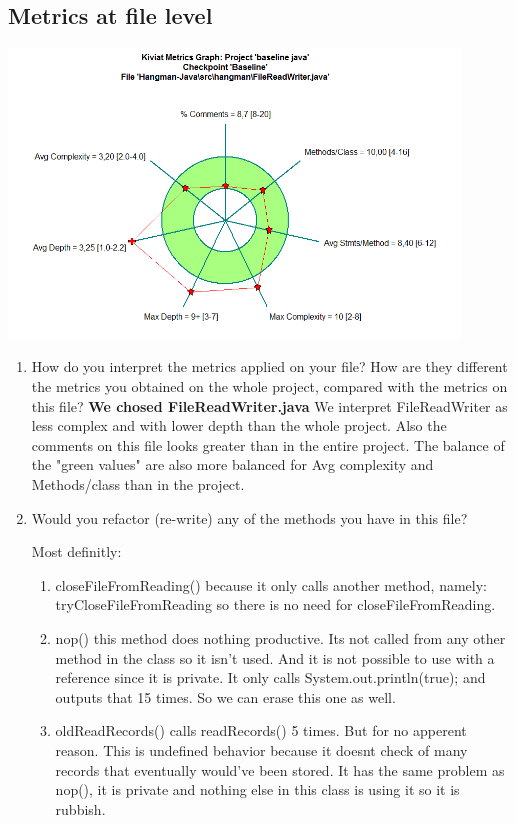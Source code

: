 \documentclass{article}
\begin{document}
\subsection{Metrics at file level}
\vspace {0.10 cm}
\begin{center}
\includegraphics[width=0.9\textwidth]{FileReadWriter-kiviat-before.png}
\end{center}
\begin{enumerate}
\item
How	do	you	interpret	 the	metrics	applied	on	your	file? How	are	 they	different	 the	metrics	you	
obtained	on	the	whole	project,	compared	with	the	metrics	on	this	file?\newline
\textbf{We chosed FileReadWriter.java}
We interpret FileReadWriter as less complex and with lower depth than
the whole project. Also the comments on this file looks greater than in
the entire project. The balance of the "green values" are also more balanced for Avg complexity
and Methods/class than in the project. 


\item
Would	you	refactor	(re-write)	any	of	the	methods you	have	in	this	file?	

Most definitly:
\begin{enumerate}
\item
closeFileFromReading() because it only calls another method, namely: tryCloseFileFromReading so there is no need for closeFileFromReading.

\item
nop() this method does nothing productive. Its not called from any other method in the class so it isn't used. And it is not possible to use with a reference since it is private.  It only calls System.out.println(true);
and outputs that 15 times. So we can erase this one as well. 

\item
oldReadRecords() calls readRecords() 5 times. But for no apperent reason.
This is undefined behavior because it doesnt check of many records that eventually
would've been stored. It has the same problem as nop(), it is private and nothing else in this class is using it so it is rubbish.


\end{enumerate}


\end{enumerate}
\end{document}
